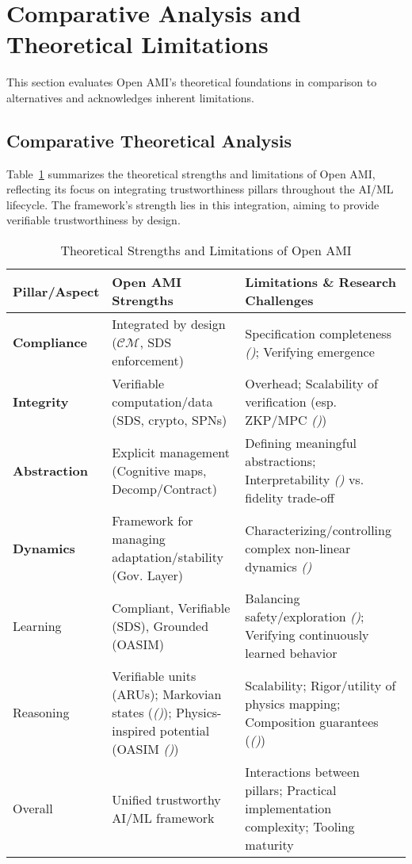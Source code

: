 \documentclass[12pt,a4paper]{report}
\renewcommand{\citep}[1]{\textit{\scriptsize{(\cite{#1})}}}
\newcommand{\Integrity}{\textbf{Integrity}}
\newcommand{\Abstraction}{\textbf{Abstraction}}
\newcommand{\Dynamics}{\textbf{Dynamics}}
\begin{document}
	\section{Comparative Analysis and Theoretical Limitations}
	\label{sec:2-12}
	
	This section evaluates Open AMI's theoretical foundations in comparison to alternatives and acknowledges inherent limitations.
	
	\subsection{Comparative Theoretical Analysis}
	\label{sec:2-12-1}
	
	Table~\ref{tab:theoretical-strengths-revised} summarizes the theoretical strengths and limitations of Open AMI, reflecting its focus on integrating trustworthiness pillars throughout the AI/ML lifecycle. The framework's strength lies in this integration, aiming to provide verifiable trustworthiness by design.
	
	\begin{table}[ht]
		\centering
		\caption[Theoretical Strengths and Limitations of Open AMI]{Theoretical Strengths and Limitations of Open AMI}
		\label{tab:theoretical-strengths-revised}
		\begin{tabular}{@{}lll@{}}
			\toprule
			\textbf{Pillar/Aspect} & \textbf{Open AMI Strengths} & \textbf{Limitations \& Research Challenges} \\
			\midrule
			\textbf{Compliance} & Integrated by design ($\mathcal{CM}$, SDS enforcement) & Specification completeness \citep{Kovac2025SpecGaming}; Verifying emergence \\
			\Integrity\ & Verifiable computation/data (SDS, crypto, SPNs) & Overhead; Scalability of verification (esp. ZKP/MPC \citep{Peng2025ZKMLSurvey}) \\
			\Abstraction\ & Explicit management (Cognitive maps, Decomp/Contract) & Defining meaningful abstractions; Interpretability \citep{Anthropic_Decompose_2023} vs. fidelity trade-off \\
			\Dynamics & Framework for managing adaptation/stability (Gov. Layer) & Characterizing/controlling complex non-linear dynamics \citep{Wang2024ContinualLearningSurvey} \\
			Learning & Compliant, Verifiable (SDS), Grounded (OASIM) & Balancing safety/exploration \citep{Constraint_RL_Survey_2024}; Verifying continuously learned behavior \\
			Reasoning & Verifiable units (ARUs); Markovian states (\citep{Teng2025AtomOfThoughtsRef}); Physics-inspired potential (OASIM \citep{Cao_PhyDRL_2024}) & Scalability; Rigor/utility of physics mapping; Composition guarantees (\citep{Buehler2025AgenticGraphRef}) \\
			Overall & Unified trustworthy AI/ML framework & Interactions between pillars; Practical implementation complexity; Tooling maturity \\
			\bottomrule
		\end{tabular}
	\end{table}
	
\end{document}
